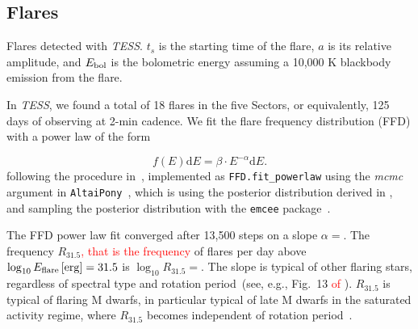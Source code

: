 \documentclass[twocolumn]{aastex631}
\begin{document}
\subsection{Flares}
\label{sec:res:flares}



\begin{table}
\centering
    \caption{Flares detected with \textit{TESS}. $t_s$ is the starting time of the flare, $a$ is its relative amplitude, and $E_{\rm bol}$ is the bolometric energy assuming a 10,000 K blackbody emission from the flare.}
    
        \label{tab:flares}
\end{table}


In \textit{TESS}, we found a total of 18 flares in the five Sectors, or equivalently, 125 days of observing at 2-min cadence. We fit the flare frequency distribution (FFD) with a power law of the form

\begin{equation}
    f(E) \mathrm{d} E = \beta \cdot E^{-\alpha} \mathrm{d} E.
\end{equation}
following the procedure in~\citet{ilin2021flares}, implemented as \texttt{FFD.fit\_powerlaw} using the \textit{mcmc} argument in \texttt{AltaiPony}~\citep{ilin2021altaipony}, which is using the posterior distribution derived in \citet{wheatland2004bayesian}, and sampling the posterior distribution with the \texttt{emcee} package~\citep{foreman-mackey2013emcee}.

The FFD power law fit converged after 13,500 steps on a slope $\alpha =$\ffdalpha\unskip. The frequency $R_{31.5}$\textcolor{red}{, that is the frequency} of flares per day above $\log_{10} E_{\rm flare}\,[\mathrm{erg}] = 31.5$ is $\log_{10}R_{31.5}=$\ffdr\unskip. The slope is typical of other flaring stars, regardless of spectral type and rotation period~(see, e.g., Fig.~13 \textcolor{red}{of} \citealt{ilin2021flares}). $R_{31.5}$ is typical of flaring M dwarfs, in particular typical of late M dwarfs in the saturated activity regime, where $R_{31.5}$ becomes independent of rotation period~\citep{medina2020flare,murray2022study}. 
\end{document}
